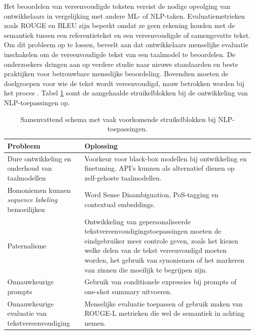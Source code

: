 \medspace

Het beoordelen van vereenvoudigde teksten vereist de nodige opvolging van ontwikkelaars in vergelijking met andere ML- of NLP-taken. Evaluatiemetrieken zoals ROUGE en BLEU zijn beperkt omdat ze geen rekening houden met de semantiek tussen een referentietekst en een vereenvoudigde of samengevatte tekst. Om dit probleem op te lossen, beveelt \textcite{Fabbri2020} aan dat ontwikkelaars menselijke evaluatie inschakelen om de vereenvoudigde tekst van een taalmodel te beoordelen. De onderzoekers dringen aan op verdere studie naar nieuwe standaarden en beste praktijken voor betrouwbare menselijke beoordeling. Bovendien moeten de doelgroepen voor wie de tekst wordt vereenvoudigd, nauw betrokken worden bij het proces \autocite{Iskender2021}. Tabel \ref{table:summary-hurdles} somt de aangehaalde struikelblokken bij de ontwikkeling van NLP-toepassingen op.

\begin{center}
	\begin{table}[H]
	\begin{tabular}{ | m{4cm} | m{10cm} | }
		\hline
		\textbf{Probleem} & \textbf{Oplossing} \\
		\hline
		Dure ontwikkeling en onderhoud van taalmodellen & Voorkeur voor black-box modellen bij ontwikkeling en finetuning. API's kunnen als alternatief dienen op zelf-gehoste taalmodellen. \\
		\hline
		Homoniemen kunnen \textit{sequence labeling} bemoeilijken & Word Sense Disambiguation, PoS-tagging en contextual embeddings. \\
		\hline
		Paternalisme & Ontwikkeling van gepersonaliseerde tekstvereenvoudigingstoepassingen moeten de eindgebruiker meer controle geven, zoals het kiezen welke delen van de tekst vereenvoudigd moeten worden, het gebruik van synoniemen of het markeren van zinnen die moeilijk te begrijpen zijn. \\
		\hline
		Onnauwkeurige prompts & Gebruik van conditionele expressies bij prompts of one-shot summary uitvoeren. \\
		\hline
		Onnauwkeurige evaluatie van tekstvereenvoudiging & Menselijke evaluatie toepassen of gebruik maken van ROUGE-L metrieken die wel de semantiek in achting nemen. \\
		\hline
	\end{tabular}
	\caption{Samenvattend schema met vaak voorkomende struikelblokken bij NLP-toepassingen.}
	\label{table:summary-hurdles}
	\end{table}
\end{center}

